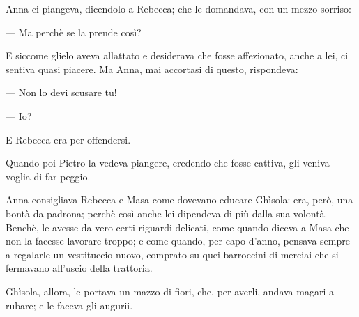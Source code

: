 Anna ci piangeva, dicendolo a Rebecca; che le domandava, con un mezzo sorriso:

— Ma perchè se la prende così?

E siccome glielo aveva allattato e desiderava che fosse affezionato, anche a lei, ci sentiva quasi piacere. Ma Anna, mai accortasi di questo, rispondeva:

— Non lo devi scusare tu!

— Io?

E Rebecca era per offendersi.

Quando poi Pietro la vedeva piangere, credendo che fosse cattiva, gli veniva voglia di far peggio.

Anna consigliava Rebecca e Masa come dovevano educare Ghìsola: era, però, una bontà da padrona; perchè così anche lei dipendeva di più dalla sua volontà. Benchè, le avesse da vero certi riguardi delicati, come quando diceva a Masa che non la facesse lavorare troppo; e come quando, per capo d'anno, pensava sempre a regalarle un vestituccio nuovo, comprato su quei barroccini di merciai che si fermavano all'uscio della trattoria.

Ghìsola, allora, le portava un mazzo di fiori, che, per averli, andava magari a rubare; e le faceva gli augurii.
